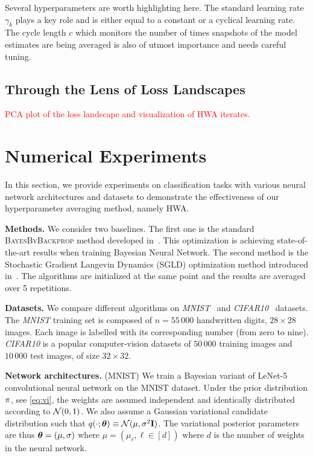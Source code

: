 \documentclass{article} %
\begin{document}
Several hyperparameters are worth highlighting here.
The standard learning rate $\gamma_k$ plays a key role and is either equal to a constant or a cyclical learning rate.
The cycle length $c$ which monitors the number of times snapshots of the model estimates are being averaged is also of utmost importance and needs careful tuning.


\subsection{Through the Lens of Loss Landscapes}
\textcolor{red}{PCA plot of the loss landscape and visualization of HWA iterates.}




\section{Numerical Experiments}\label{sec:numerical}
In this section, we provide experiments on classification tasks with various neural network architectures and datasets to demonstrate the effectiveness of our hyperparameter averaging method, namely HWA.

\textbf{Methods.}\hspace{0.1in}
We consider two baselines. 
The first one is the standard \textsc{BayesByBackprop} method developed in~\citep{blundell2015weight}. 
This optimization is achieving state-of-the-art results when training Bayesian Neural Network.
The second method is the Stochastic Gradient Langevin Dynamics (SGLD) optimization method introduced in~\citep{welling2011bayesian}.
The algorithms are initialized at the same point and the results are averaged over 5 repetitions.


\textbf{Datasets.}\hspace{0.1in}
We compare different algorithms on \textit{MNIST}~\citep{lecun-mnisthandwrittendigit-2010} and \textit{CIFAR10}~\citep{krizhevsky2009learning} datasets.
The \textit{MNIST} training set is composed of $n=55\,000$ handwritten digits, $28 \times 28$ images. Each image is labelled with its corresponding number (from zero to nine).
\textit{CIFAR10} is a popular computer-vision datasets of $50\,000$ training images and $10\,000$ test images, of size $32\times 32$. 

\textbf{Network architectures.} \hspace{0.1in}
(MNIST) We train a Bayesian variant of LeNet-5 convolutional neural network on the MNIST dataset. 
Under the prior distribution $\prior$, see \eqref{eq:vi}, the weights are assumed  independent and identically distributed according to ${\cal N}(0,1)$.
We also assume a Gaussian variational candidate distribution such that $q(\cdot; \param) \equiv  \mathcal{N}(\mu,\sigma^2 \Id )$.
The variational posterior parameters are thus $\param = (\mu, \sigma) $ where $\mu = (\mu_\ell, \ell \in [d])$ where $d$ is the number of weights in the neural network. 
\end{document}
